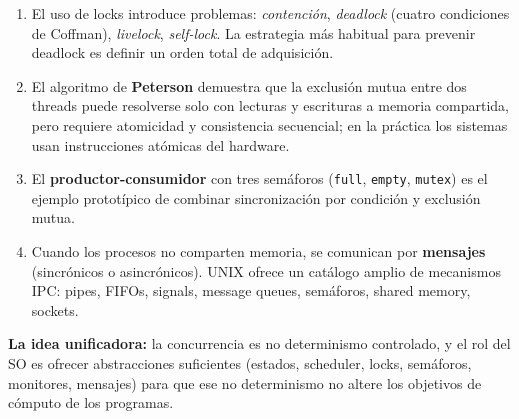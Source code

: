 \documentclass[11pt,a4paper]{article}
\begin{document}
\begin{enumerate}[leftmargin=*]
\begin{itemize}[leftmargin=*,nosep]
                anteriores en una clase \emph{thread safe}.
        \end{itemize}
    \item El uso de locks introduce problemas: \emph{contención},
        \emph{deadlock} (cuatro condiciones de Coffman),
        \emph{livelock}, \emph{self-lock}. La estrategia más habitual
        para prevenir deadlock es definir un orden total de
        adquisición.
    \item El algoritmo de \textbf{Peterson} demuestra que la
        exclusión mutua entre dos threads puede resolverse solo con
        lecturas y escrituras a memoria compartida, pero requiere
        atomicidad y consistencia secuencial; en la práctica los
        sistemas usan instrucciones atómicas del hardware.
    \item El \textbf{productor-consumidor} con tres semáforos
        (\texttt{full}, \texttt{empty}, \texttt{mutex}) es el
        ejemplo prototípico de combinar sincronización por condición
        y exclusión mutua.
    \item Cuando los procesos no comparten memoria, se comunican por
        \textbf{mensajes} (sincrónicos o asincrónicos). UNIX ofrece
        un catálogo amplio de mecanismos IPC: pipes, FIFOs, signals,
        message queues, semáforos, shared memory, sockets.
\end{enumerate}

\begin{importante}
\textbf{La idea unificadora:} la concurrencia es no determinismo
controlado, y el rol del SO es ofrecer abstracciones suficientes
(estados, scheduler, locks, semáforos, monitores, mensajes) para que
ese no determinismo no altere los objetivos de cómputo de los
programas.
\end{importante}
\end{document}
